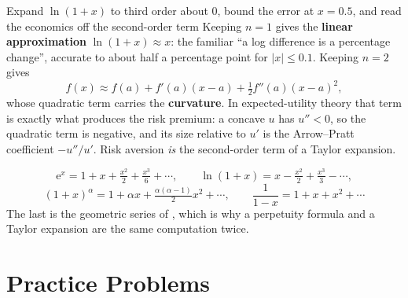 \begin{worked}{Expand $\ln(1+x)$ to third order about $0$, bound the error at $x=0.5$, and read the economics off the second-order term}
Keeping $n=1$ gives the \textbf{linear approximation} $\ln(1+x)\approx x$:
the familiar ``a log difference is a percentage change'', accurate to about
half a percentage point for $|x|\le0.1$. Keeping $n=2$ gives
\[
  f(x)\approx f(a)+f'(a)(x-a)+\tfrac12 f''(a)(x-a)^{2},
\]
whose quadratic term carries the \textbf{curvature}. In expected-utility
theory that term is exactly what produces the risk premium: a concave $u$
has $u''<0$, so the quadratic term is negative, and its size relative to
$u'$ is the Arrow--Pratt coefficient $-u''/u'$. Risk aversion \emph{is} the
second-order term of a Taylor expansion.

\[
  \mathrm{e}^{x}=1+x+\tfrac{x^{2}}{2}+\tfrac{x^{3}}{6}+\cdots,
  \qquad
  \ln(1+x)=x-\tfrac{x^{2}}{2}+\tfrac{x^{3}}{3}-\cdots,
\]
\[
  (1+x)^{\alpha}=1+\alpha x+\tfrac{\alpha(\alpha-1)}{2}x^{2}+\cdots,
  \qquad
  \frac{1}{1-x}=1+x+x^{2}+\cdots
\]
The last is the geometric series of , which is why a perpetuity
formula and a Taylor expansion are the same computation twice.
\end{worked}

\section{Practice Problems}

